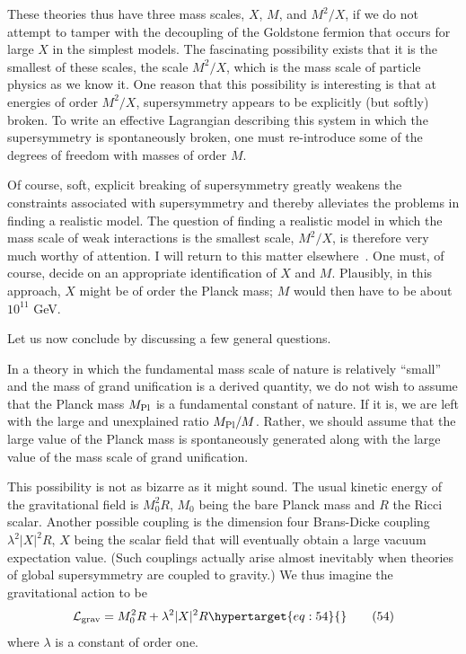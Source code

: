 \documentclass[11pt,a4paper]{article}
\newcommand{\eqtarget}[1]{\hypertarget{eq:#1}{\mathstrut}\tag{#1}}
\newcommand{\asteriskfootnotetext}[1]{\footnotetext[1]{#1}}
\begin{document}
\asteriskfootnotetext{I wish to thank T. Banks for convincing me of this.}

These theories thus have three mass scales, $X$, $M$, and $M^2/X$, if
we do not attempt to tamper with the decoupling of the Goldstone
fermion that occurs for large $X$ in the simplest models. The fascinating
possibility exists that it is the smallest of these scales, the
scale $M^2/X$, which is the mass scale of particle physics as we know it.
One reason that this possibility is interesting is that at energies
of order $M^2/X$, supersymmetry appears to be explicitly (but softly)
broken. To write an effective Lagrangian describing this system in
which the supersymmetry is spontaneously broken, one must re-introduce
some of the degrees of freedom with masses of order $M$.

Of course, soft, explicit breaking of supersymmetry greatly
weakens the constraints associated with supersymmetry and thereby
alleviates the problems in finding a realistic model. The question
of finding a realistic model in which the mass scale of weak interactions
is the smallest scale, $M^2/X$, is therefore very much worthy
of attention. I will return to this matter elsewhere~\cite{ref19}. One must,
of course, decide on an appropriate identification of $X$ and $M$.
Plausibly, in this approach, $X$ might be of order the Planck mass;
$M$ would then have to be about $10^{11}$ GeV.

Let us now conclude by discussing a few general questions.

In a theory in which the fundamental mass scale of nature is
relatively ``small'' and the mass of grand unification is a derived
quantity, we do not wish to assume that the Planck mass $M_{\rm Pl}$ is a
fundamental constant of nature. If it is, we are left with the large
and unexplained ratio $M_{\rm Pl}/M$. Rather, we should assume that the large
value of the Planck mass is spontaneously generated along with the
large value of the mass scale of grand unification.

This possibility is not as bizarre as it might sound. The
usual kinetic energy of the gravitational field is $M_0^2 R$, $M_0$ being
the bare Planck mass and $R$ the Ricci scalar. Another possible
coupling is the dimension four Brans-Dicke coupling $\lambda^2 |X|^2 R$, $X$ being the
scalar field that will eventually obtain a large vacuum expectation
value. (Such couplings actually arise almost inevitably when theories
of global supersymmetry are coupled to gravity.) We thus
imagine the gravitational action to be
\begin{equation}
\mathcal{L}_{\rm grav} = M_0^2 R + \lambda^2 |X|^2 R
\eqtarget{54}
\end{equation}
where $\lambda$ is a constant of order one.
\end{document}
